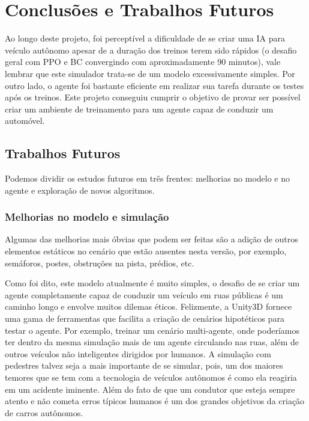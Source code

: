 \chapter*{Conclusões e Trabalhos Futuros}\label{cap:conclusao}

Ao longo deste projeto, foi perceptível a dificuldade de se criar uma IA para veículo autônomo apesar de a duração dos treinos terem sido rápidos (o desafio geral com PPO e BC convergindo com aproximadamente 90 minutos), vale lembrar que este simulador trata-se de um modelo excessivamente simples. Por outro lado, o agente foi bastante eficiente em realizar sua tarefa durante os testes após os treinos. Este projeto conseguiu cumprir o objetivo de provar ser possível criar um ambiente de treinamento para um agente capaz de conduzir um automóvel.

\section*{Trabalhos Futuros}

Podemos dividir os estudos futuros em três frentes: melhorias no modelo e no agente e exploração de novos algoritmos.

\subsection*{Melhorias no modelo e simulação}
Algumas das melhorias mais óbvias que podem ser feitas são a adição de outros elementos estáticos no cenário que estão ausentes nesta versão, por exemplo, semáforos, postes, obstruções na pista, prédios, etc. 

Como foi dito, este modelo atualmente é muito simples, o desafio de se criar um agente completamente capaz de conduzir um veículo em ruas públicas é um caminho longo e envolve muitos dilemas éticos. Felizmente, a Unity3D fornece uma gama de ferramentas que facilita a criação de cenários hipotéticos para testar o agente. Por exemplo, treinar um cenário multi-agente, onde poderíamos ter dentro da mesma simulação mais de um agente circulando nas ruas, além de outros veículos não inteligentes dirigidos por humanos. A simulação com pedestres talvez seja a mais importante de se simular, pois, um dos maiores temores que se tem com a tecnologia de veículos autônomos é como ela reagiria em um acidente iminente. Além do fato de que um condutor que esteja sempre atento e não cometa erros típicos humanos é um dos grandes objetivos da criação de carros autônomos.


